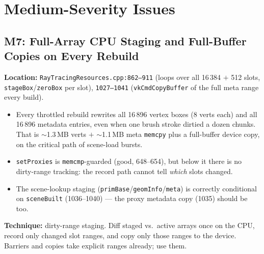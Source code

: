 \documentclass[11pt,a4paper]{article}
\begin{document}
\section{Medium-Severity Issues}

\subsection{M7: Full-Array CPU Staging and Full-Buffer Copies on Every Rebuild}

\textbf{Location:} \texttt{RayTracingResources.cpp:862--911} (loops over all 16\,384 $+$ 512 slots, \texttt{stageBox}/\texttt{zeroBox} per slot), \texttt{1027--1041} (\texttt{vkCmdCopyBuffer} of the full meta range every build).

\begin{itemize}
    \item Every throttled rebuild rewrites all 16\,896 vertex boxes (8 verts each) and all 16\,896 metadata entries, even when one brush stroke dirtied a dozen chunks. That is $\sim$1.3\,MB verts $+$ $\sim$1.1\,MB meta \texttt{memcpy} plus a full-buffer device copy, on the critical path of scene-load bursts.
    \item \texttt{setProxies} is \texttt{memcmp}-guarded (good, 648--654), but below it there is no dirty-range tracking: the record path cannot tell \textit{which} slots changed.
    \item The scene-lookup staging (\texttt{primBase}/\texttt{geomInfo}/\texttt{meta}) is correctly conditional on \texttt{sceneBuilt} (1036--1040) --- the proxy metadata copy (1035) should be too.
\end{itemize}

\textbf{Technique:} dirty-range staging. Diff staged vs.\ active arrays once on the CPU, record only changed slot ranges, and copy only those ranges to the device. Barriers and copies take explicit ranges already; use them.
\end{document}
